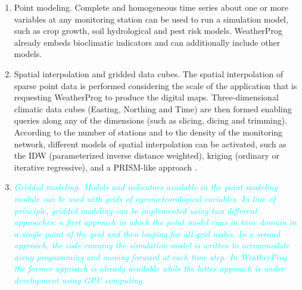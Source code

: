 \documentclass[authoryear,preprint,review,12pt]{elsarticle}
\newcommand{\review}[1]{\emph{\textcolor{cyan}{#1}}}
\begin{document}
\begin{enumerate}
    \item Point modeling. Complete and homogeneous time series about one or more variables at any monitoring station can be used to run a simulation model, such as crop growth, soil hydrological and pest risk models.
    WeatherProg already embeds bioclimatic indicators and can additionally include other models.
    
    \item Spatial interpolation and gridded data cubes. The spatial interpolation of sparse point data is performed considering the scale of the application that is requesting WeatherProg to produce the digital maps.
    Three-dimensional climatic data cubes (Easting, Northing and Time) are then formed enabling queries along any of the dimensions (such as slicing, dicing and trimming).
    According to the number of stations and to the density of the monitoring network, different models of spatial interpolation can be activated, such as the IDW (parameterized inverse distance weighted), kriging (ordinary or iterative regressive), and a PRISM-like approach \citep{Daly08_PRISM_USA}.
    \item \review{Gridded modeling. Models and indicators available in the point modeling module can be used with grids of agrometeorological variables.
    In line of principle, gridded modeling can be implemented using two different approaches: a first approach in which the point model runs in time domain in a single point of the grid and then looping for all grid nodes.
    In a second approach, the code running the simulation model is written to accommodate array programming and moving forward at each time step.
    In WeatherProg the former approach is already available while the latter approach is under development using GPU computing.}
    
\end{enumerate}
\end{document}
